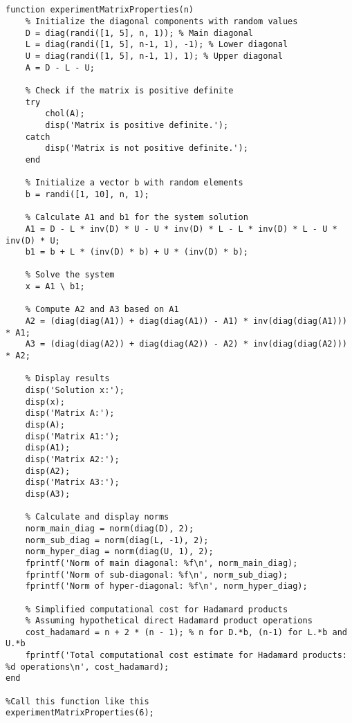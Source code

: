 \documentclass[12pt,a4paper]{article}
\begin{document}
\subsection{}
\begin{verbatim}
function experimentMatrixProperties(n)
    % Initialize the diagonal components with random values
    D = diag(randi([1, 5], n, 1)); % Main diagonal
    L = diag(randi([1, 5], n-1, 1), -1); % Lower diagonal
    U = diag(randi([1, 5], n-1, 1), 1); % Upper diagonal
    A = D - L - U;

    % Check if the matrix is positive definite
    try
        chol(A);
        disp('Matrix is positive definite.');
    catch
        disp('Matrix is not positive definite.');
    end

    % Initialize a vector b with random elements
    b = randi([1, 10], n, 1);

    % Calculate A1 and b1 for the system solution
    A1 = D - L * inv(D) * U - U * inv(D) * L - L * inv(D) * L - U * inv(D) * U;
    b1 = b + L * (inv(D) * b) + U * (inv(D) * b);

    % Solve the system
    x = A1 \ b1;

    % Compute A2 and A3 based on A1
    A2 = (diag(diag(A1)) + diag(diag(A1)) - A1) * inv(diag(diag(A1))) * A1;
    A3 = (diag(diag(A2)) + diag(diag(A2)) - A2) * inv(diag(diag(A2))) * A2;

    % Display results
    disp('Solution x:');
    disp(x);
    disp('Matrix A:');
    disp(A);
    disp('Matrix A1:');
    disp(A1);
    disp('Matrix A2:');
    disp(A2);
    disp('Matrix A3:');
    disp(A3);

    % Calculate and display norms
    norm_main_diag = norm(diag(D), 2);
    norm_sub_diag = norm(diag(L, -1), 2);
    norm_hyper_diag = norm(diag(U, 1), 2);
    fprintf('Norm of main diagonal: %f\n', norm_main_diag);
    fprintf('Norm of sub-diagonal: %f\n', norm_sub_diag);
    fprintf('Norm of hyper-diagonal: %f\n', norm_hyper_diag);

    % Simplified computational cost for Hadamard products
    % Assuming hypothetical direct Hadamard product operations
    cost_hadamard = n + 2 * (n - 1); % n for D.*b, (n-1) for L.*b and U.*b
    fprintf('Total computational cost estimate for Hadamard products: %d operations\n', cost_hadamard);
end

%Call this function like this 
experimentMatrixProperties(6);

\end{verbatim}
\end{document}
